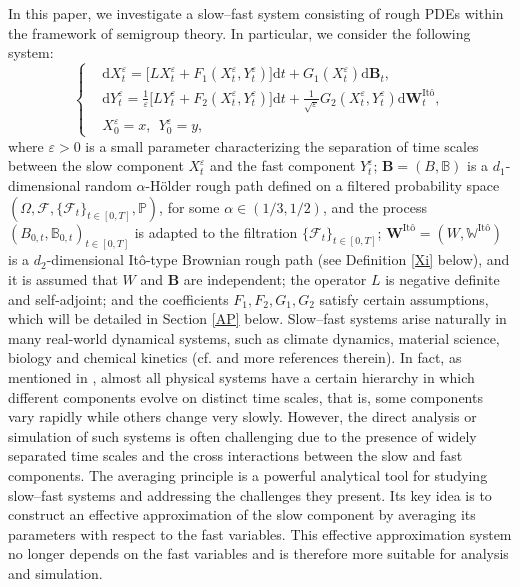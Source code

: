 \documentclass[10pt,a4paper]{article}
\numberwithin{equation}{section}
\begin{document}
In this paper, we investigate a slow--fast system consisting of rough PDEs within the framework of semigroup theory.
In particular, we consider the following system:
\begin{equation}\label{troeq2}
	\left\{ \begin{aligned}
		&\mathrm{d} X_t^\varepsilon=\big[L X_t^\varepsilon+F_1 (X_t^\varepsilon,Y_t^\varepsilon)\big]\mathrm{d} t+G_1 (X_t^\varepsilon)\mathrm{d} \mathbf B_t,\\
		&\mathrm{d} Y_t^\varepsilon=\frac 1\varepsilon \big[L Y_t^\varepsilon+F_2 (X_t^\varepsilon,
		Y_t^\varepsilon)\big]\mathrm{d} t+\frac 1{\sqrt{\varepsilon}}G_2 (X_t^\varepsilon,
		Y_t^\varepsilon)  \mathrm{d} \mathbf W^{\text{It\^{o}} }_t,\\
		&X_0^\varepsilon=x, ~~ Y_0^\varepsilon=y,
	\end{aligned}  \right.
\end{equation}
where $\varepsilon >0$ is a small parameter characterizing the separation of time scales between the slow component $X_t^\varepsilon$ and the fast component $Y_t^\varepsilon$;
$\mathbf B=(B, \mathbb B)$ is a $d_1$-dimensional random $\alpha$-H\"{o}lder rough path defined on a filtered probability space $(\Omega, \mathcal{F}, \{\mathcal{F}_t\}_{t \in [0, T]},\mathbb{P})$, for some $\alpha \in (1/3,1/2)$, and the process $(B_{0,t}, \mathbb B_{0,t})_{t \in [0,T]}$ is adapted to the filtration $\{\mathcal{F}_t\}_{t \in [0, T]}$;
$\mathbf W^{\text{It\^{o}} }=(W,\mathbb W^{\text{It\^{o}} })$ is a $d_2$-dimensional It\^{o}-type Brownian rough path (see Definition \ref{Xi} below), and it is assumed that $W$ and $\mathbf B$ are independent;
the operator $L$ is negative definite and self-adjoint;
and the coefficients $F_1,F_2,G_1, G_2$ satisfy certain assumptions, which will be detailed in Section \ref{AP} below.
Slow--fast systems arise naturally in many real-world dynamical systems, such as climate dynamics, material science, biology and chemical kinetics (cf. \cite{EE03,Ki01} and more references therein).
In fact, as mentioned in \cite{SA61}, almost all physical systems have a certain hierarchy in which different components evolve on distinct time scales, that is, some components vary rapidly while others change very slowly.
However, the direct analysis or simulation of such systems is often challenging due to the presence of widely separated time scales and the cross interactions between the slow and fast components.
The averaging principle is a powerful analytical tool for studying slow--fast systems and addressing the challenges they present.
Its key idea is to construct an effective approximation of the slow component by averaging its parameters with respect to the fast variables.
This effective approximation system no longer depends on the fast variables and is therefore more suitable for analysis and simulation.
\end{document}
